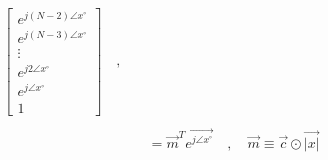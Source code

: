 \documentclass{article}
\begin{document}
\begin{align*}
\begin{bmatrix}
                                                        e^{j(N - 2)\angle{x}^{\circ}} \\
                                                        e^{j(N - 3)\angle{x}^{\circ}} \\
                                                        \vdots \\
                                                        e^{j2\angle{x}^{\circ}} \\
                                                        e^{j\angle{x}^{\circ}} \\
                                                        1
                                                      \end{bmatrix} \quad , \quad \\ \\
            &= \vec{m}^{T}\vec{e^{j\angle{x}^{\circ}}} \quad , \quad \vec{m} \equiv \vec{c} \odot \vec{|x|} 
\end{align*}
\end{document}
